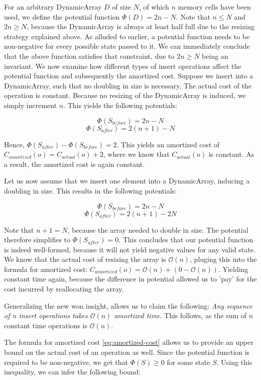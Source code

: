 For an arbitrary DynamicArray \(D\) of size \(N\), of which \(n\) memory cells have been used,  we define the potential function \(\Phi(D) = 2n - N\). Note that \(n \leq N\) and \(2n \geq N\), because the DynamicArray is always at least half full due to the resizing strategy explained above. 
As alluded to earlier, a potential function needs to be non-negative for every possible state passed to it. We can immediately conclude that the above function satisfies that constraint, due to \(2n \geq N\) being an invariant. We now examine how different types of insert operations affect the potential function and subsequently the amortized cost.
Suppose we insert into a DynamicArray, such that no doubling in size is necessary. The actual cost of the operation is constant. Because no resizing of the DynamicArray is induced, we simply increment \(n\). This yields the following potentials:

\[\Phi(S_{before}) = 2n - N\]
\[\Phi(S_{after}) = 2(n + 1) - N\]

Hence, \(\Phi(S_{after}) - \Phi(S_{before}) = 2\). This yields an amortized cost of \(C_{amortized}(o) = C_{actual}(o) + 2\), where we know that \(C_{actual}(o)\) is constant. As a result, the amortized cost is again constant.

Let us now assume that we insert one element into a DynamicArray, inducing a doubling in size. This results in the following potentials:

\[\Phi(S_{before}) = 2n - N\]
\[\Phi(S_{after}) = 2(n + 1) - 2N\]

Note that \(n + 1 = N\), because the array needed to double in size. The potential therefore simplifies to \(\Phi(S_{after}) = 0\). This concludes that our potential function is indeed well-formed, because it will not yield negative values for any valid state.
We know that the actual cost of resizing the array is \(\mathcal{O}(n)\), pluging this into the formula for amortized cost: \(C_{amortized}(o) = \mathcal{O}(n) + ( 0 - \mathcal{O}(n))\). Yielding constant time again, because the difference in potential allowed us to 'pay' for the cost incurred by reallocating the array.

Generalizing the new won insight, allows us to claim the following: \emph{Any sequence of n insert operations takes \(\mathcal{O}(n)\) amortized time}. This follows, as the sum of \(n\) constant time operations is \(\mathcal{O}(n)\). 

The formula for amortized cost \ref{eq:amortized-cost} allows us to provide an upper bound on the actual cost of an operation as well. Since the potential function is required to be non-negative, we get that \(\Phi(S) \geq 0\) for some state \(S\). Using this inequality, we can infer the following bound: 

